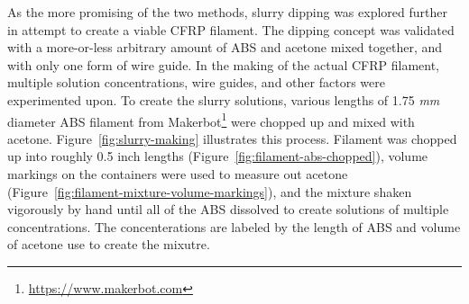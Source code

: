 As the more promising of the two methods, slurry dipping was explored further in attempt to create a viable CFRP filament. The dipping concept was validated with a more-or-less arbitrary amount of ABS and acetone mixed together, and with only one form of wire guide. In the making of the actual CFRP filament, multiple solution concentrations, wire guides, and other factors were experimented upon. To create the slurry solutions, various lengths of 1.75 \emph{mm} diameter ABS filament from Makerbot\footnote{\url{https://www.makerbot.com}} were chopped up and mixed with acetone. Figure~\ref{fig:slurry-making} illustrates this process. Filament was chopped up into roughly 0.5 inch lengths (Figure~\ref{fig:filament-abs-chopped}), volume markings on the containers were used to measure out acetone (Figure~\ref{fig:filament-mixture-volume-markings}), and the mixture shaken vigorously by hand until all of the ABS dissolved to create solutions of multiple concentrations. The concenterations are labeled by the length of ABS and volume of acetone use to create the mixutre. \\


